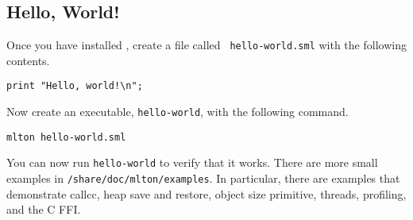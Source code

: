 \subsection{Hello, World!}

Once you have installed {\mlton}, create a file called {\tt
hello-world.sml} with the following contents.

\begin{verbatim}
print "Hello, world!\n";
\end{verbatim}
Now create an executable, {\tt hello-world}, with the following command.
\begin{verbatim}
mlton hello-world.sml
\end{verbatim}
You can now run {\tt hello-world} to verify that it works.  There are
more small examples in {\tt \prefix/share/doc/mlton/examples}.  In
particular, there are examples that demonstrate callcc, heap save and
restore, object size primitive, threads, profiling, and the C FFI.
